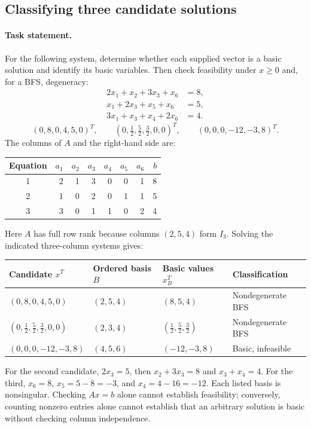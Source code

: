 \documentclass[11pt,a4paper]{article}
\begin{document}
\subsection{Classifying three candidate solutions}
\paragraph{Task statement.}
For the following system, determine whether each supplied vector is a basic
solution and identify its basic variables. Then check feasibility under
$x\geq0$ and, for a BFS, degeneracy:
\begin{equation}\label{eq:classification}
  \begin{aligned}
    2x_1+x_2+3x_3+x_6&=8,\\
    x_1+2x_3+x_5+x_6&=5,\\
    3x_1+x_3+x_4+2x_6&=4.
  \end{aligned}
\end{equation}
\[
  (0,8,0,4,5,0)^T,\qquad
  (0,\tfrac12,\tfrac52,\tfrac32,0,0)^T,\qquad
  (0,0,0,-12,-3,8)^T.
\]
The columns of $A$ and the right-hand side are:
\begin{center}
  \begin{tabular}{c*{6}{r}@{\qquad}r}\toprule
    Equation & $a_1$ & $a_2$ & $a_3$ & $a_4$ & $a_5$ & $a_6$ & $b$\\\midrule
    1 & 2 & 1 & 3 & 0 & 0 & 1 & 8\\
    2 & 1 & 0 & 2 & 0 & 1 & 1 & 5\\
    3 & 3 & 0 & 1 & 1 & 0 & 2 & 4\\\bottomrule
  \end{tabular}
\end{center}
Here $A$ has full row rank because columns $(2,5,4)$ form $I_3$.
Solving the indicated three-column systems gives:
\begin{center}
  \begin{tabular}{llll}\toprule
    Candidate $x^T$ & Ordered basis $B$ & Basic values $x_B^T$ & Classification\\\midrule
    $(0,8,0,4,5,0)$ & $(2,5,4)$ & $(8,5,4)$ & Nondegenerate BFS\\
    $(0,\frac12,\frac52,\frac32,0,0)$ & $(2,3,4)$ & $(\frac12,\frac52,\frac32)$ & Nondegenerate BFS\\
    $(0,0,0,-12,-3,8)$ & $(4,5,6)$ & $(-12,-3,8)$ & Basic, infeasible\\\bottomrule
  \end{tabular}
\end{center}
For the second candidate, $2x_3=5$, then $x_2+3x_3=8$ and $x_3+x_4=4$.
For the third, $x_6=8$, $x_5=5-8=-3$, and $x_4=4-16=-12$.
Each listed basis is nonsingular. Checking $Ax=b$ alone cannot establish
feasibility; conversely, counting nonzero entries alone cannot establish that
an arbitrary solution is basic without checking column independence.
\end{document}

